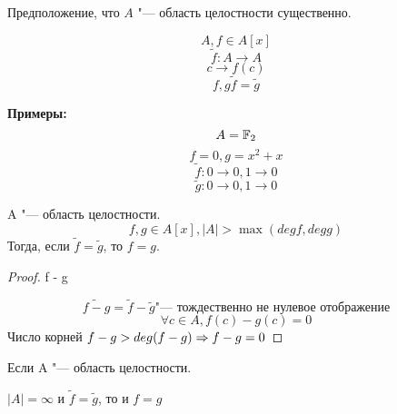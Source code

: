 \begin{Rem}
Предположение, что $A$ "--- область целостности существенно.  
\end{Rem}

\begin{Def}
$$A, f \in A[x]$$
$$\tilde f: A \to A$$
$$c \to f(c)$$
$$f, g \tilde f = \tilde g$$
\end{Def}
{\bf Примеры:}
$$A = \mathbb{F}_2$$
$$f = 0, g = x^2 + x$$
$$ \tilde f: 0 \to 0, 1 \to 0$$
$$ \tilde g: 0 \to 0, 1 \to 0$$

\begin{conseq}
A "--- область целостности.
$$f, g \in A[x], |A| > \max(deg f, deg g)$$
Тогда, если $\tilde f = \tilde g$, то $f = g$.
\end{conseq}
\begin{proof}
f - g

$$\tilde{f - g} = \tilde f - \tilde g \text{"--- тождественно не нулевое отображение}$$
$$\forall c \in A, f(c) - g(c) = 0$$
Число корней $f - g > deg(f - g) \Rightarrow f - g = 0$
\end{proof}

\begin{conseq}
Если A "--- область целостности.

$|A| = \infty$ и $\tilde f = \tilde g$, то и $f = g$
\end{conseq}